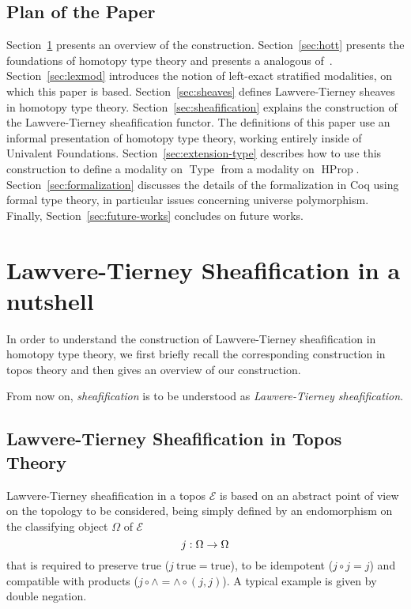 \documentclass[preprint,9pt,numbers]{sigplanconf}
\DeclareMathOperator{\Type}{Type}
\DeclareMathOperator{\HProp}{HProp}
\newcommand \True {\mathrm{true}}
\newcommand \E {\mathcal{E}}
\newenvironment{mymath}[1][-0em]{%
  \newcommand\mymathaux{\vspace{#1}}%
  \vspace{#1}%
  \begin{equation*}%
  }{ %
    \mymathaux%
  \end{equation*}}
\begin{document}
\subsection{Plan of the Paper}

Section~\ref{sec:lawv-tiern-nutshell} presents an overview of the
construction.
% 
Section~\ref{sec:hott} presents the foundations of homotopy type theory
and presents a analogous of~\cite[Corollary 6.2.3.5]{lurie}. 
%
Section~\ref{sec:lexmod} introduces the notion of left-exact stratified
modalities, on which this paper is based.
%
Section~\ref{sec:sheaves} defines Lawvere-Tierney sheaves in homotopy
type theory.
%
Section~\ref{sec:sheafification} explains the construction of the
Lawvere-Tierney sheafification functor.
%
The definitions of this paper use an informal presentation of
homotopy type theory, working entirely inside of Univalent
Foundations. 
Section~\ref{sec:extension-type} describes how to use this
construction to define a modality on $\Type$ from a modality on
$\HProp$.
%
Section~\ref{sec:formalization} discusses the details of the
formalization in Coq using formal type theory, in particular issues
concerning universe polymorphism.
%
Finally, Section~\ref{sec:future-works} concludes on future works.

\section{Lawvere-Tierney Sheafification in a nutshell}
\label{sec:lawv-tiern-nutshell}


In order to understand the construction of Lawvere-Tierney sheafification in homotopy
type theory, we first briefly recall the corresponding construction in
topos theory and then gives an overview of our construction.

From now on, {\em sheafification} is to be understood as {\em
  Lawvere-Tierney sheafification}.

\subsection{Lawvere-Tierney Sheafification in Topos Theory}
\label{sec:lawv-tiern-sheaf}


Lawvere-Tierney sheafification in a topos $\E$ is based on an abstract
point of view on the topology to be considered, being simply defined by an
endomorphism on the classifying object $\Omega$ of $\E$  
%
\begin{mymath}
j : \Omega \rightarrow \Omega
\end{mymath}%
%
that is required to preserve $\True$ ($j \ \True = \True$), to be
idempotent ($j \circ j = j$) and compatible with products ($j \circ
\wedge = \wedge \circ (j, j)$).
%
A typical example is given by double negation.
\end{document}
